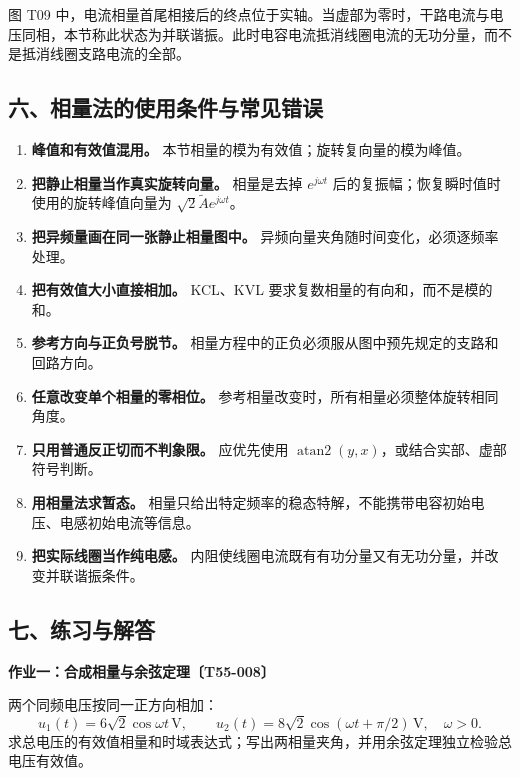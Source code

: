 图 T09
中，电流相量首尾相接后的终点位于实轴。当虚部为零时，干路电流与电压同相，本节称此状态为并联谐振。此时电容电流抵消线圈电流的无功分量，而不是抵消线圈支路电流的全部。

\subsection{六、相量法的使用条件与常见错误}\label{m6:ux516dux76f8ux91cfux6cd5ux7684ux4f7fux7528ux6761ux4ef6ux4e0eux5e38ux89c1ux9519ux8bef}

\begin{enumerate}
\def\labelenumi{\arabic{enumi}.}
\tightlist
\item
  \textbf{峰值和有效值混用。}
  本节相量的模为有效值；旋转复向量的模为峰值。
\item
  \textbf{把静止相量当作真实旋转向量。} 相量是去掉 \(e^{j\omega t}\)
  后的复振幅；恢复瞬时值时使用的旋转峰值向量为
  \(\sqrt2\widetilde A e^{j\omega t}\)。
\item
  \textbf{把异频量画在同一张静止相量图中。}
  异频向量夹角随时间变化，必须逐频率处理。
\item
  \textbf{把有效值大小直接相加。} KCL、KVL
  要求复数相量的有向和，而不是模的和。
\item
  \textbf{参考方向与正负号脱节。}
  相量方程中的正负必须服从图中预先规定的支路和回路方向。
\item
  \textbf{任意改变单个相量的零相位。}
  参考相量改变时，所有相量必须整体旋转相同角度。
\item
  \textbf{只用普通反正切而不判象限。} 应优先使用
  \(\operatorname{atan2}(y,x)\)，或结合实部、虚部符号判断。
\item
  \textbf{用相量法求暂态。}
  相量只给出特定频率的稳态特解，不能携带电容初始电压、电感初始电流等信息。
\item
  \textbf{把实际线圈当作纯电感。}
  内阻使线圈电流既有有功分量又有无功分量，并改变并联谐振条件。
\end{enumerate}

\subsection{七、练习与解答}\label{m6:ux4e03ux7ec3ux4e60ux4e0eux89e3ux7b54}

\par{}
\noindent\begin{minipage}{\linewidth}

\textbf{作业一：合成相量与余弦定理〔T55-008〕}

两个同频电压按同一正方向相加：
\[u_1(t)=6\sqrt2\cos\omega t\,\mathrm V,\qquad
u_2(t)=8\sqrt2\cos(\omega t+\pi/2)\,\mathrm V,\quad\omega>0.\]
求总电压的有效值相量和时域表达式；写出两相量夹角，并用余弦定理独立检验总电压有效值。

\end{minipage}\par


